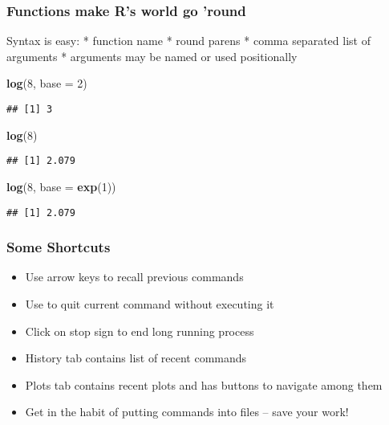 \documentclass[ignorenonframetext,]{beamer}
\newenvironment{Shaded}{}{}
\newcommand{\KeywordTok}[1]{\textcolor[rgb]{0.00,0.44,0.13}{\textbf{{#1}}}}
\newcommand{\DataTypeTok}[1]{\textcolor[rgb]{0.56,0.13,0.00}{{#1}}}
\newcommand{\DecValTok}[1]{\textcolor[rgb]{0.25,0.63,0.44}{{#1}}}
\newcommand{\NormalTok}[1]{{#1}}
\begin{document}
\begin{frame}[fragile]\frametitle{Functions make R's world go 'round}

Syntax is easy: * function name * round parens * comma separated list of
arguments * arguments may be named or used positionally

\begin{Shaded}
\begin{Highlighting}[]
\KeywordTok{log}\NormalTok{(}\DecValTok{8}\NormalTok{, }\DataTypeTok{base =} \DecValTok{2}\NormalTok{)}
\end{Highlighting}
\end{Shaded}

\begin{verbatim}
## [1] 3
\end{verbatim}

\begin{Shaded}
\begin{Highlighting}[]
\KeywordTok{log}\NormalTok{(}\DecValTok{8}\NormalTok{)}
\end{Highlighting}
\end{Shaded}

\begin{verbatim}
## [1] 2.079
\end{verbatim}

\begin{Shaded}
\begin{Highlighting}[]
\KeywordTok{log}\NormalTok{(}\DecValTok{8}\NormalTok{, }\DataTypeTok{base =} \KeywordTok{exp}\NormalTok{(}\DecValTok{1}\NormalTok{))}
\end{Highlighting}
\end{Shaded}

\begin{verbatim}
## [1] 2.079
\end{verbatim}

\end{frame}

\begin{frame}\frametitle{Some Shortcuts}

\begin{itemize}[<+->]
\item
  Use arrow keys to recall previous commands
\item
  Use to quit current command without executing it
\item
  Click on stop sign to end long running process
\item
  History tab contains list of recent commands
\item
  Plots tab contains recent plots and has buttons to navigate among them
\item
  Get in the habit of putting commands into files -- save your work!
\end{itemize}

\end{frame}
\end{document}
